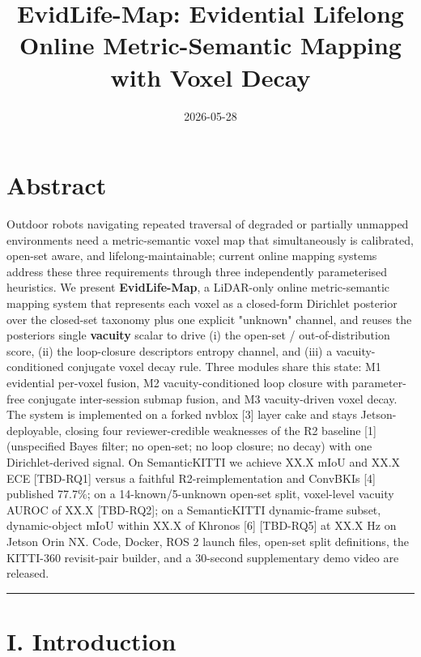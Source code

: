 \documentclass[
]{article}
\title{EvidLife-Map: Evidential Lifelong Online Metric-Semantic Mapping
with Voxel Decay}
\author{}
\date{2026-05-28}
\begin{document}
\maketitle

\section{Abstract}\label{abstract}

Outdoor robots navigating repeated traversal of degraded or partially
unmapped environments need a metric-semantic voxel map that
simultaneously is calibrated, open-set aware, and lifelong-maintainable;
current online mapping systems address these three requirements through
three independently parameterised heuristics. We present
\textbf{EvidLife-Map}, a LiDAR-only online metric-semantic mapping
system that represents each voxel as a closed-form Dirichlet posterior
over the closed-set taxonomy plus one explicit "unknown" channel, and
reuses the posterior\textquotesingle s single \textbf{vacuity} scalar to
drive (i) the open-set / out-of-distribution score, (ii) the
loop-closure descriptor\textquotesingle s entropy channel, and (iii) a
vacuity-conditioned conjugate voxel decay rule. Three modules share this
state: M1 evidential per-voxel fusion, M2 vacuity-conditioned loop
closure with parameter-free conjugate inter-session submap fusion, and
M3 vacuity-driven voxel decay. The system is implemented on a forked
nvblox {[}3{]} layer cake and stays Jetson-deployable, closing four
reviewer-credible weaknesses of the R2 baseline {[}1{]} (unspecified
Bayes filter; no open-set; no loop closure; no decay) with one
Dirichlet-derived signal. On SemanticKITTI we achieve XX.X mIoU and XX.X
ECE {[}TBD-RQ1{]} versus a faithful R2-reimplementation and
ConvBKI\textquotesingle s {[}4{]} published 77.7\%; on a
14-known/5-unknown open-set split, voxel-level vacuity AUROC of XX.X
{[}TBD-RQ2{]}; on a SemanticKITTI dynamic-frame subset, dynamic-object
mIoU within XX.X of Khronos {[}6{]} {[}TBD-RQ5{]} at XX.X Hz on Jetson
Orin NX. Code, Docker, ROS 2 launch files, open-set split definitions,
the KITTI-360 revisit-pair builder, and a 30-second supplementary demo
video are released.

\begin{center}\rule{0.5\linewidth}{0.5pt}\end{center}

\section{I. Introduction}\label{i-introduction}
\end{document}
